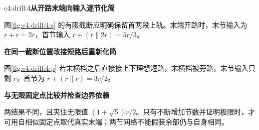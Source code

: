 \begin{drillsolution}{c4:drill:4}\textbf{从开路末端向输入逐节化简}\par\nobreak
图\ref{fig:c4:drill:4:s} 的有限截断应明确保留首两段上轨。末端开路时，末节输入为 $r+r=2r$，首节输入 $r+(r\parallel2r)=5r/3$。



\par\medskip{}\noindent\textbf{在同一截断位置改接短路后重新化简}\par\nobreak
图\ref{fig:c4:drill:4:p} 若末横档之后直接接上下理想短路，末横档被旁路，末节输入只剩 $r$，首节为 $r+(r\parallel r)=3r/2$。

\par\medskip{}\noindent\textbf{与无限固定点比较并检查边界依赖}\par\nobreak
两结果不同，且夹住无限值 $(1+\sqrt5)r/2$。只有不断增加节数并证明极限时，才可用自相似固定点取代真实末端；两节网络不能假装余部仍与自身相同。\end{drillsolution}
